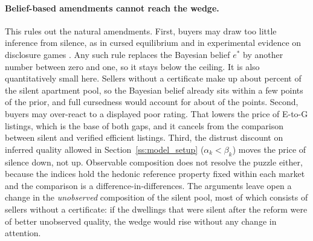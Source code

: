 \paragraph{Belief-based amendments cannot reach the wedge.}
This rules out the natural amendments. First, buyers may draw too little inference from silence, as in cursed equilibrium and in experimental evidence on disclosure games \citep[e.g.,][]{eyster_cursed_2005, jin_is_2021, hagenbach_motivated_2025}. Any such rule replaces the Bayesian belief $e^*$ by another number between zero and one, so it stays below the ceiling. It is also quantitatively small here. Sellers without a certificate make up about \attShareUninfApt{} percent of the silent apartment pool, so the Bayesian belief already sits within a few points of the prior, and full cursedness would account for about \attCursedApt{} of the \attLamApt{} points. Second, buyers may over-react to a displayed poor rating. That lowers the price of E-to-G listings, which is the base of both gaps, and it cancels from the comparison between silent and verified efficient listings. Third, the distrust discount on inferred quality allowed in Section~\ref{ss:model_setup} ($\alpha_k<\beta_k$) moves the price of silence down, not up. Observable composition does not resolve the puzzle either, because the indices hold the hedonic reference property fixed within each market and the comparison is a difference-in-differences. The arguments leave open a change in the \emph{unobserved} composition of the silent pool, most of which consists of sellers without a certificate: if the dwellings that were silent after the reform were of better unobserved quality, the wedge would rise without any change in attention.
